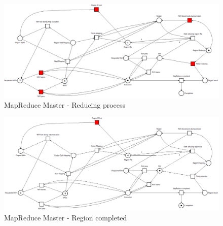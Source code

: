 \begin{figure}[!ht]
    \centering
    \includegraphics[width=\linewidth]{document/chapters/chapter_6/images/master_petri_net_4.png}
    \caption{MapReduce Master - Reducing process}
    \label{fig:master_petri_net_4}
\end{figure}

\begin{figure}[!ht]
    \centering
    \includegraphics[width=\linewidth]{document/chapters/chapter_6/images/master_petri_net_5.png}
    \caption{MapReduce Master - Region completed}
    \label{fig:master_petri_net_5}
\end{figure}